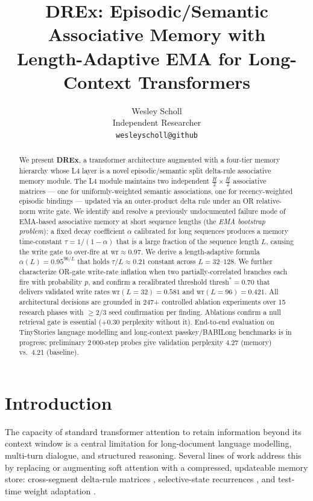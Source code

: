 \documentclass{article}
\title{DREx: Episodic/Semantic Associative Memory with\\
       Length-Adaptive EMA for Long-Context Transformers}
\author{%
  Wesley Scholl \\
  Independent Researcher \\
  \texttt{wesleyscholl@github} \\
}
\begin{document}
\maketitle

\begin{abstract}
We present \textbf{DREx}, a transformer architecture augmented with a four-tier memory
hierarchy whose L4 layer is a novel episodic/semantic split delta-rule associative memory
module.  The L4 module maintains two independent $\tfrac{H}{2} \times \tfrac{H}{2}$
associative matrices — one for uniformly-weighted semantic associations, one for
recency-weighted episodic bindings — updated via an outer-product delta rule under an
OR relative-norm write gate.  We identify and resolve a previously undocumented failure
mode of EMA-based associative memory at short sequence lengths (the \emph{EMA bootstrap
problem}): a fixed decay coefficient $\alpha$ calibrated for long sequences produces
a memory time-constant $\tau = 1/(1-\alpha)$ that is a large fraction of the sequence
length $L$, causing the write gate to over-fire at $\mathrm{wr} \approx 0.97$.  We
derive a length-adaptive formula $\alpha(L) = 0.95^{96/L}$ that holds $\tau/L \approx
0.21$ constant across $L=32$--$128$.  We further characterize OR-gate write-rate
inflation when two partially-correlated branches each fire with probability $p$, and
confirm a recalibrated threshold $\mathrm{thresh}^* = 0.70$ that delivers validated
write rates $\mathrm{wr}(L{=}32) = 0.581$ and $\mathrm{wr}(L{=}96) = 0.421$.
All architectural decisions are grounded in 247+ controlled ablation experiments over
15 research phases with $\geq\!2/3$ seed confirmation per finding.
Ablations confirm a null retrieval gate is essential ($+0.30$ perplexity without it).
End-to-end evaluation on TinyStories language modelling and long-context passkey/BABILong
benchmarks is in progress; preliminary 2\,000-step probes give validation perplexity
4.27 (memory) vs.\ 4.21 (baseline).
\end{abstract}

\section{Introduction}
\label{sec:intro}

The capacity of standard transformer attention to retain information beyond its context
window is a central limitation for long-document language modelling, multi-turn dialogue,
and structured reasoning.  Several lines of work address this by replacing or augmenting
soft attention with a compressed, updateable memory store: cross-segment delta-rule
matrices \citep{munkhdalai2024infini}, selective-state recurrences
\citep{gu2024mamba,peng2023rwkv,sun2023retnet}, and test-time weight adaptation
\citep{sun2024titans}.
\end{document}
